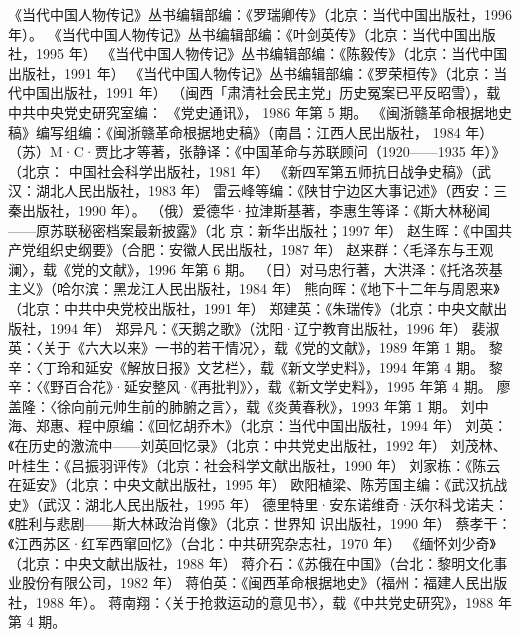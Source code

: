 \begin{thebibliography}{999}
\bibitem{} 《当代中国人物传记》丛书编辑部编：《罗瑞卿传》（北京：当代中国出版社，1996 年）。
\bibitem{} 《当代中国人物传记》丛书编辑部编：《叶剑英传》（北京：当代中国出版社，1995 年）
\bibitem{} 《当代中国人物传记》丛书编辑部编：《陈毅传》（北京：当代中国出版社，1991 年）
\bibitem{} 《当代中国人物传记》丛书编辑部编：《罗荣桓传》（北京：当代中国出版社，1991 年）
\bibitem{} （闽西「肃清社会民主党」历史冤案已平反昭雪），载中共中央党史研究室编： 《党史通讯》， 1986 年第 5 期。
\bibitem{} 《闽浙赣革命根据地史稿》编写组编：《闽浙赣革命根据地史稿》（南昌：江西人民出版社， 1984 年）
\bibitem{} （苏）M·C·贾比才等著，张静译：《中国革命与苏联顾问（1920——1935 年）》（北京： 中国社会科学出版社，1981 年）
\bibitem{} 《新四军第五师抗日战争史稿》（武汉：湖北人民出版社，1983 年）
\bibitem{} 雷云峰等编：《陕甘宁边区大事记述》（西安：三秦出版社，1990 年）。
\bibitem{} （俄）爱德华·拉津斯基著，李惠生等译：《斯大林秘闻——原苏联秘密档案最新披露》（北 京：新华出版社；1997 年）
\bibitem{} 赵生晖：《中国共产党组织史纲要》（合肥：安徽人民出版社，1987 年）
\bibitem{} 赵来群：〈毛泽东与王观澜〉，载《党的文献》，1996 年第 6 期。
\bibitem{} （日）对马忠行著，大洪泽：《托洛茨基主义》（哈尔滨：黑龙江人民出版社，1984 年）
\bibitem{} 熊向晖：《地下十二年与周恩来》（北京：中共中央党校出版社，1991 年）
\bibitem{} 郑建英：《朱瑞传》（北京：中央文献出版社，1994 年）
\bibitem{} 郑异凡：《天鹅之歌》（沈阳·辽宁教育出版社，1996 年）
\bibitem{} 裴淑英：〈关于《六大以来》一书的若干情况〉，载《党的文献》，1989 年第 1 期。
\bibitem{} 黎辛：〈丁玲和延安《解放日报》文艺栏〉，载《新文学史料》，1994 年第 4 期。
\bibitem{} 黎辛：〈《野百合花》·延安整风·《再批判》〉，载《新文学史料》，1995 年第 4 期。
\bibitem{} 廖盖隆：〈徐向前元帅生前的肺腑之言〉，载《炎黄春秋》，1993 年第 1 期。
\bibitem{} 刘中海、郑惠、程中原编：《回忆胡乔木》（北京：当代中国出版社，1994 年）
\bibitem{} 刘英：《在历史的激流中——刘英回忆录》（北京：中共党史出版社，1992 年）
\bibitem{} 刘茂林、叶桂生：《吕振羽评传》（北京：社会科学文献出版社，1990 年）
\bibitem{} 刘家栋：《陈云在延安》（北京：中央文献出版社，1995 年）
\bibitem{} 欧阳植梁、陈芳国主编：《武汉抗战史》（武汉：湖北人民出版社，1995 年）
\bibitem{} 德里特里·安东诺维奇·沃尔科戈诺夫：《胜利与悲剧——斯大林政治肖像》（北京：世界知 识出版社，1990 年）
\bibitem{} 蔡孝干：《江西苏区·红军西窜回忆》（台北：中共研究杂志社，1970 年）
\bibitem{} 《缅怀刘少奇》（北京：中央文献出版社，1988 年）
\bibitem{} 蒋介石：《苏俄在中国》（台北：黎明文化事业股份有限公司，1982 年）
\bibitem{} 蒋伯英：《闽西革命根据地史》（福州：福建人民出版社，1988 年）。
\bibitem{} 蒋南翔：〈关于抢救运动的意见书〉，载《中共党史研究》，1988 年第 4 期。

\end{thebibliography}

